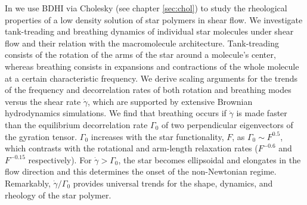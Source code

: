\documentclass[ twoside,openright,titlepage,numbers=noenddot,%
headinclude,footinclude,cleardoublepage=empty,abstract=on,
BCOR=5mm,paper=a4,fontsize=11pt, dvipsnames
]{scrreprt}
\begin{document}
In \cite{Pelaez2020} we use \gls{BDHI} via Cholesky (see chapter \ref{sec:chol}) to study the rheological properties of a low density solution of star polymers in shear flow.
We investigate tank-treading and breathing dynamics of individual star molecules under shear flow and their relation with the macromolecule architecture. Tank-treading consists of the rotation of the arms of the star around a molecule’s center, whereas breathing consists in expansions and contractions of the whole molecule at a certain characteristic frequency. We derive scaling arguments for the trends of the frequency and decorrelation rates of both rotation and breathing modes versus the shear rate $\dot{\gamma}$, which are supported by extensive Brownian hydrodynamics simulations. We find that breathing occurs if $\dot{\gamma}$ is made faster than the equilibrium decorrelation rate $\Gamma_0$ of two perpendicular eigenvectors of the gyration tensor. $\Gamma_0$ increases with the star functionality, $F$, as $\Gamma_0 \sim F^{0.5}$, which contrasts with the rotational and arm-length relaxation rates ($F^{-0.6}$ and $F^ {-0.15}$ respectively). For $\dot{\gamma} > \Gamma_0$, the star becomes ellipsoidal and elongates in the flow direction and this determines the onset of the non-Newtonian regime. Remarkably, $\dot{\gamma}/\Gamma_0$ provides universal trends for the shape, dynamics, and rheology of the star polymer.
%
%
\end{document}
